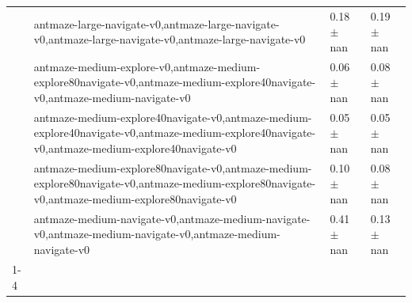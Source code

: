 \begin{tabular}{llll}
 & antmaze-large-navigate-v0,antmaze-large-navigate-v0,antmaze-large-navigate-v0,antmaze-large-navigate-v0 & 0.18 $\pm$ nan & 0.19 $\pm$ nan \\
 & antmaze-medium-explore-v0,antmaze-medium-explore80navigate-v0,antmaze-medium-explore40navigate-v0,antmaze-medium-navigate-v0 & 0.06 $\pm$ nan & 0.08 $\pm$ nan \\
 & antmaze-medium-explore40navigate-v0,antmaze-medium-explore40navigate-v0,antmaze-medium-explore40navigate-v0,antmaze-medium-explore40navigate-v0 & 0.05 $\pm$ nan & 0.05 $\pm$ nan \\
 & antmaze-medium-explore80navigate-v0,antmaze-medium-explore80navigate-v0,antmaze-medium-explore80navigate-v0,antmaze-medium-explore80navigate-v0 & 0.10 $\pm$ nan & 0.08 $\pm$ nan \\
 & antmaze-medium-navigate-v0,antmaze-medium-navigate-v0,antmaze-medium-navigate-v0,antmaze-medium-navigate-v0 & 0.41 $\pm$ nan & 0.13 $\pm$ nan \\
\cline{1-4}
\bottomrule
\end{tabular}

